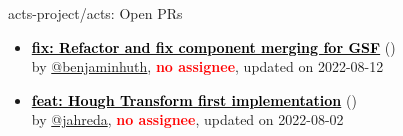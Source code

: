 \begin{frame}[allowframebreaks]{ acts-project/acts: Open PRs
}
\begin{itemize}
    \item\propen\textbf{\href{https://github.com/acts-project/acts/pull/1364}{\textcolor{black}{fix: Refactor and fix component merging for GSF}}}
    (\href{https://github.com/acts-project/acts/pull/1364}{}) \\
    by \href{https://github.com/benjaminhuth}{@benjaminhuth}, {}\textbf{\textcolor{Red}{no assignee}}, updated on 2022-08-12

    \item\propen\textbf{\href{https://github.com/acts-project/acts/pull/1305}{\textcolor{black}{feat: Hough Transform first implementation}}}
    (\href{https://github.com/acts-project/acts/pull/1305}{}) \\
    by \href{https://github.com/jahreda}{@jahreda}, {}\textbf{\textcolor{Red}{no assignee}}, updated on 2022-08-02

    
  \end{itemize}

\end{frame}







